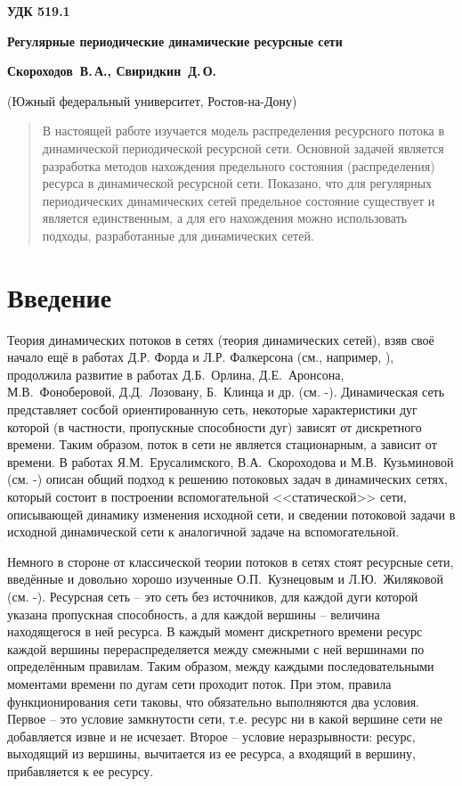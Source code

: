 \documentclass[a4paper,12pt]{article}
\begin{document}
\Large
\baselineskip=8mm

{\bf УДК 519.1}

{\bf Регулярные периодические динамические ресурсные сети}

{\bf Скороходов~В.\,А., 
Свиридкин~Д.\,О.} 

(Южный федеральный университет, Ростов-на-Дону)


\begin{abstract}
В настоящей работе изучается модель распределения ресурсного потока в динамической периодической ресурсной сети. Основной задачей является разработка методов нахождения предельного состояния (распределения) ресурса в динамической ресурсной сети. Показано, что для регулярных периодических динамических сетей предельное состояние существует и является единственным, а для его нахождения можно использовать подходы, разработанные для динамических сетей.
\end{abstract}



\section{Введение}

\indent

Теория динамических потоков в сетях (теория динамических сетей), взяв своё начало ещё в работах Д.Р. Форда и Л.Р. Фалкерсона (см., например, \cite{SvSkor:FordFulkersonDyn}), продолжила развитие в работах Д.Б.~Орлина, Д.Е.~Аронсона,  М.В.~Фоноберовой, Д.Д.~Лозовану,  Б.~Клинца и др. (см. \cite{SvSkor:Aronson}-\cite{SvSkor:SkorChebot}). Динамическая сеть представляет сосбой ориентированную сеть, некоторые характеристики дуг которой (в частности, пропускные способности дуг) зависят от дискретного времени. Таким образом, поток в сети не является стационарным, а зависит от времени. В работах Я.М.~Ерусалимского, В.А.~Скороходова и М.В.~Кузьминовой (см. \cite{SvSkor:ErusSkor}-\cite{SvSkor:Kuzm}) описан общий подход к решению потоковых задач в динамических сетях, который состоит в построении вспомогательной <<статической>> сети, описывающей динамику изменения исходной сети, и сведении потоковой задачи в исходной динамической сети к аналогичной задаче на вспомогательной. 

Немного в стороне от классической теории потоков в сетях стоят ресурсные сети, введённые и довольно хорошо изученные О.П.~Кузнецовым и Л.Ю.~Жиляковой (см. \cite{SvSkor:Kuzn}-\cite{SvSkor:Zhil2}). Ресурсная сеть -- это сеть без источников, для каждой дуги которой указана пропускная способность, а для каждой вершины -- величина находящегося в ней ресурса. В каждый момент дискретного времени ресурс каждой вершины перераспределяется между смежными с ней вершинами по определённым правилам. Таким образом, между каждыми последовательными моментами времени по дугам сети проходит поток. При этом, правила функционирования сети таковы, что обязательно выполняются два условия. Первое -- это условие замкнутости сети, т.е. ресурс ни в какой вершине сети не добавляется извне и не исчезает. Второе -- условие неразрывности: ресурс, выходящий из вершины, вычитается из ее ресурса, а входящий в вершину, прибавляется к ее ресурсу.
\end{document}
